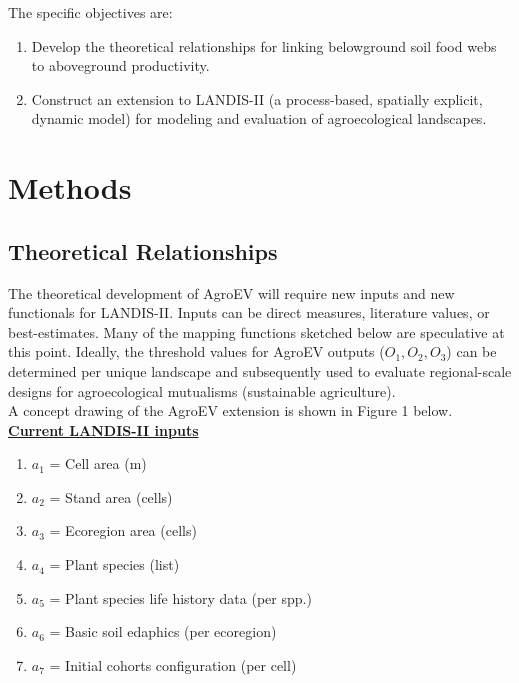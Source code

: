 The specific objectives are:
\begin{enumerate}
  \item Develop the theoretical relationships for linking belowground soil food webs to aboveground productivity.
  \item Construct an extension to LANDIS-II (a process-based, spatially explicit, dynamic model) for modeling and evaluation of agroecological landscapes. 
\end{enumerate}



\section{Methods}

\subsection{Theoretical Relationships}
The theoretical development of AgroEV will require new inputs and new functionals for LANDIS-II.  Inputs can be direct measures, literature values, or best-estimates. Many of the mapping functions sketched below are speculative at this point. Ideally, the threshold values for AgroEV outputs ($ O_1, O_2, O_3$) can be determined per unique landscape and subsequently used to evaluate regional-scale designs for agroecological mutualisms (sustainable agriculture). \\

A concept drawing of the AgroEV extension is shown in Figure 1 below.\\

\noindent \textbf{\underline{Current LANDIS-II inputs}}
\begin{enumerate}
  \item $a_1$ = Cell area (m)
  \item $a_2$ = Stand area (cells)
  \item $a_3$ = Ecoregion area (cells)
  \item $a_4$ = Plant species  (list)
  \item $a_5$ = Plant species life history data (per spp.)
  \item $a_6$ = Basic soil edaphics (per ecoregion)
  \item $a_7$ = Initial cohorts configuration (per cell)
\end{enumerate}

\vspace{5 mm}

